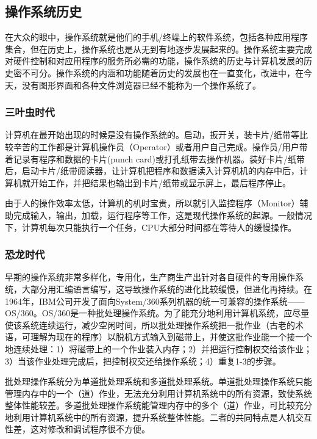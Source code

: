 \subsection{操作系统历史}

在大众的眼中，操作系统就是他们的手机/终端上的软件系统，包括各种应用程序集合，但在历史上，操作系统也是从无到有地逐步发展起来的。操作系统主要完成对硬件控制和对应用程序的服务所必需的功能，操作系统的历史与计算机发展的历史密不可分。操作系统的内涵和功能随着历史的发展也在一直变化，改进中，在今天，没有图形界面和各种文件浏览器已经不能称为一个操作系统了。

\subsubsection{三叶虫时代}

计算机在最开始出现的时候是没有操作系统的。启动，扳开关，装卡片/纸带等比较辛苦的工作都是计算机操作员（Operator）或者用户自己完成。操作员/用户带着记录有程序和数据的卡片(punch card)或打孔纸带去操作机器。装好卡片/纸带后，启动卡片/纸带阅读器，让计算机把程序和数据读入计算机机的内存中后，计算机就开始工作，并把结果也输出到卡片/纸带或显示屏上，最后程序停止。

由于人的操作效率太低，计算机的机时宝贵，所以就引入监控程序（Monitor）辅助完成输入，输出，加载，运行程序等工作，这是现代操作系统的起源。一般情况下，计算机每次只能执行一个任务，CPU大部分时间都在等待人的缓慢操作。

\subsubsection{恐龙时代}

早期的操作系统非常多样化，专用化，生产商生产出针对各自硬件的专用操作系统，大部分用汇编语言编写，这导致操作系统的进化比较缓慢，但进化再持续。在1964年，IBM公司开发了面向System/360系列机器的统一可兼容的操作系统——OS/360。OS/360是一种批处理操作系统。为了能充分地利用计算机系统，应尽量使该系统连续运行，减少空闲时间，所以批处理操作系统把一批作业（古老的术语，可理解为现在的程序）以脱机方式输入到磁带上，并使这批作业能一个接一个地连续处理：1）将磁带上的一个作业装入内存；2）并把运行控制权交给该作业；3）当该作业处理完成后，把控制权交还给操作系统；4）重复1-3的步骤。

批处理操作系统分为单道批处理系统和多道批处理系统。单道批处理操作系统只能管理内存中的一个（道）作业，无法充分利用计算机系统中的所有资源，致使系统整体性能较差。多道批处理操作系统能管理内存中的多个（道）作业，可比较充分地利用计算机系统中的所有资源，提升系统整体性能。二者的共同特点是人机交互性差，这对修改和调试程序很不方便。


